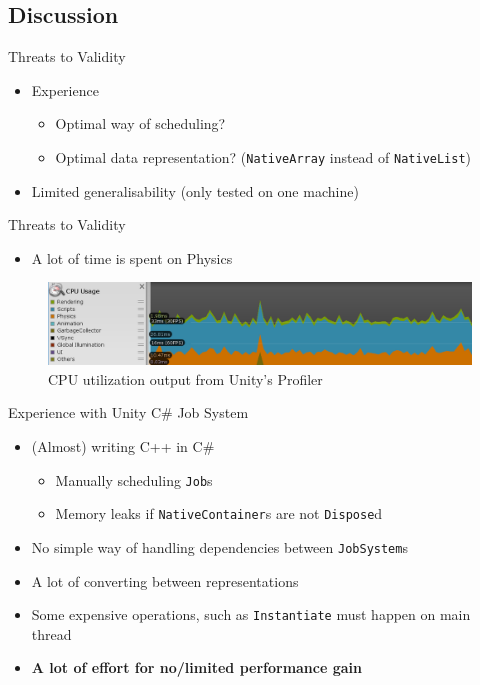 \subsection{Discussion}
\begin{frame}{\secname}{\subsecname}
	Threats to Validity
	\begin{itemize}
		\item Experience
		\begin{itemize}
			\item Optimal way of scheduling?
			\item Optimal data representation? (\texttt{NativeArray} instead of \texttt{NativeList})
		\end{itemize}
		\item Limited generalisability (only tested on one machine)
	\end{itemize}
\end{frame}

\begin{frame}{\secname}{\subsecname}
	Threats to Validity
	\begin{itemize}
		\item A lot of time is spent on Physics
	\end{itemize}
	\begin{figure}[h!]
		\centering
		\includegraphics[width=\textwidth]{pictures/profiling.png}
		\caption{CPU utilization output from Unity's Profiler}
		\label{fig:unity:profiler}
	\end{figure}
\end{frame}

\begin{frame}{\secname}{\subsecname}
	Experience with Unity C\# Job System
	\begin{itemize}
		\item (Almost) writing C++ in C\#
		\begin{itemize}
			\item Manually scheduling \texttt{Job}s
			\item Memory leaks if \texttt{NativeContainer}s are not \texttt{Dispose}d
		\end{itemize}
		\item No simple way of handling dependencies between \texttt{JobSystem}s
		\item A lot of converting between representations
		\item Some expensive operations, such as \texttt{Instantiate} must happen on main thread
		\item \textbf{A lot of effort for no/limited performance gain}
	\end{itemize}
\end{frame}
